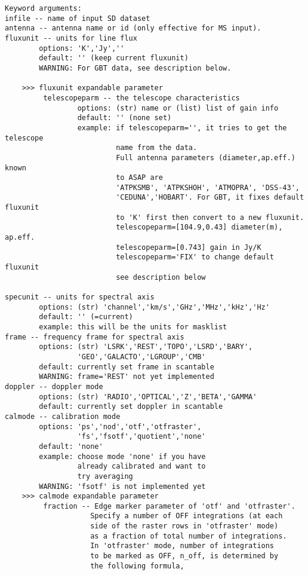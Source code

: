 \begin{verbatim}
Keyword arguments:
infile -- name of input SD dataset
antenna -- antenna name or id (only effective for MS input). 
fluxunit -- units for line flux
        options: 'K','Jy',''
        default: '' (keep current fluxunit)
        WARNING: For GBT data, see description below.

    >>> fluxunit expandable parameter
         telescopeparm -- the telescope characteristics
                 options: (str) name or (list) list of gain info
                 default: '' (none set)
                 example: if telescopeparm='', it tries to get the telescope
                          name from the data.
                          Full antenna parameters (diameter,ap.eff.) known
                          to ASAP are
                          'ATPKSMB', 'ATPKSHOH', 'ATMOPRA', 'DSS-43',
                          'CEDUNA','HOBART'. For GBT, it fixes default fluxunit
                          to 'K' first then convert to a new fluxunit.
                          telescopeparm=[104.9,0.43] diameter(m), ap.eff.
                          telescopeparm=[0.743] gain in Jy/K
                          telescopeparm='FIX' to change default fluxunit
                          see description below

specunit -- units for spectral axis
        options: (str) 'channel','km/s','GHz','MHz','kHz','Hz'
        default: '' (=current)
        example: this will be the units for masklist
frame -- frequency frame for spectral axis
        options: (str) 'LSRK','REST','TOPO','LSRD','BARY',
                 'GEO','GALACTO','LGROUP','CMB'
        default: currently set frame in scantable
        WARNING: frame='REST' not yet implemented
doppler -- doppler mode
        options: (str) 'RADIO','OPTICAL','Z','BETA','GAMMA'
        default: currently set doppler in scantable
calmode -- calibration mode
        options: 'ps','nod','otf','otfraster',
                 'fs','fsotf','quotient','none'
        default: 'none'
        example: choose mode 'none' if you have
                 already calibrated and want to
                 try averaging
        WARNING: 'fsotf' is not implemented yet
    >>> calmode expandable parameter
         fraction -- Edge marker parameter of 'otf' and 'otfraster'.
                    Specify a number of OFF integrations (at each
                    side of the raster rows in 'otfraster' mode)
                    as a fraction of total number of integrations.
                    In 'otfraster' mode, number of integrations 
                    to be marked as OFF, n_off, is determined by 
                    the following formula,


\end{verbatim}
